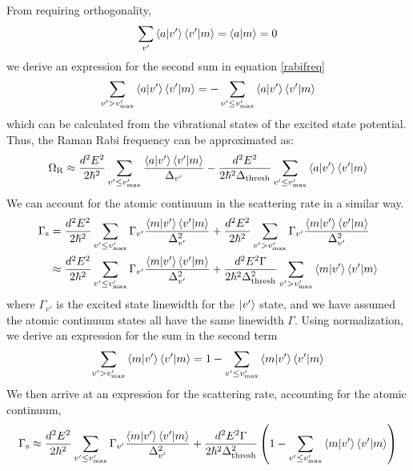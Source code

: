 \documentclass[aps,secnumarabic,amsmath,amssymb,10pt,superscriptaddress]{revtex4}
\begin{document}
From requiring orthogonality,
\begin{equation}
  \displaystyle\sum_{v'} \braket{a|v'}\braket{v'|m} = \braket{a|m} = 0
\end{equation}
we derive an expression for the second sum in equation \ref{rabifreq}
\begin{equation}
  \displaystyle\sum_{v'> v'_{\text{max}}} \braket{a|v'}\braket{v'|m} = -\displaystyle\sum_{v' \leq v'_{\text{max}}} \braket{a|v'}\braket{v'|m}
\end{equation}
which can be calculated from the vibrational states of the excited state potential. Thus, the Raman Rabi frequency can be approximated as:
\begin{equation}
  \Omega_{\rm R} \approx \frac{d^2E^2}{2\hbar^2}\displaystyle\sum_{v' \leq v'_{\text{max}}} \frac{\braket{a|v'}\braket{v'|m}}{\Delta_{v'}} -  \frac{d^2E^2}{2\hbar^2\Delta_{\text{thresh}}}\displaystyle\sum_{v' \leq v'_{\text{max}}} \braket{a|v'}\braket{v'|m}
\end{equation}
We can account for the atomic continuum in the scattering rate in a similar way.
\begin{align}
  \Gamma_{\rm s} &= \frac{d^2E^2}{2\hbar^2}\displaystyle\sum_{v' \leq v'_{\text{max}}}\Gamma_{v'} \frac{\braket{m|v'}\braket{v'|m}}{\Delta_{v'}^2} + \frac{d^2E^2}{2\hbar^2}\displaystyle\sum_{v' > v'_{\text{max}}}\Gamma_{v'} \frac{\braket{m|v'}\braket{v'|m}}{\Delta_{v'}^2} \\
           &\approx \frac{d^2E^2}{2\hbar^2}\displaystyle\sum_{v' \leq v'_{\text{max}}}\Gamma_{v'} \frac{\braket{m|v'}\braket{v'|m}}{\Delta_{v'}^2} + \frac{d^2E^2\Gamma}{2\hbar^2\Delta_{\text{thresh}}^2}\displaystyle\sum_{v' > v'_{\text{max}}}\braket{m|v'}\braket{v'|m}
\end{align}
where $\Gamma_{v'}$ is the excited state linewidth for the $\ket{v'}$ state, and we have assumed the atomic continuum states all have the same linewidth $\Gamma$. Using normalization, we derive an expression for the sum in the second term
\begin{equation}
  \displaystyle\sum_{v' > v'_{\text{max}}}\braket{m|v'}\braket{v'|m} = 1 - \displaystyle\sum_{v' \leq v'_{\text{max}}}\braket{m|v'}\braket{v'|m}
\end{equation}
We then arrive at an expression for the scattering rate, accounting for the atomic continuum,
\begin{equation}
  \Gamma_{\rm s} \approx \frac{d^2E^2}{2\hbar^2}\displaystyle\sum_{v' \leq v'_{\text{max}}}\Gamma_{v'} \frac{\braket{m|v'}\braket{v'|m}}{\Delta_{v'}^2} +  \frac{d^2E^2\Gamma}{2\hbar^2\Delta_{\text{thresh}}^2}\left(1 - \displaystyle\sum_{v' \leq v'_{\text{max}}}\braket{m|v'}\braket{v'|m}\right)
\end{equation}
\end{document}
